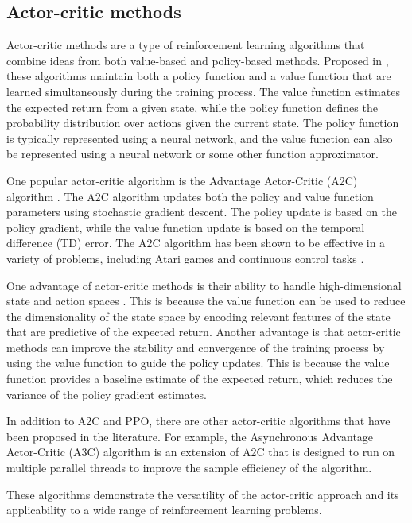 \subsection{Actor-critic methods}
Actor-critic methods are a type of reinforcement learning algorithms that combine ideas from both value-based and policy-based methods.
Proposed in \autocite{konda1999}, these algorithms maintain both a policy function and a value function that are learned simultaneously during the training process.
The value function estimates the expected return from a given state, while the policy function defines the probability distribution over actions given the current state.
The policy function is typically represented using a neural network, and the value function can also be represented using a neural network or some other function approximator.

One popular actor-critic algorithm is the Advantage Actor-Critic (A2C) algorithm \autocite{mnih2016}.
The A2C algorithm updates both the policy and value function parameters using stochastic gradient descent.
The policy update is based on the policy gradient, while the value function update is based on the temporal difference (TD) error.
The A2C algorithm has been shown to be effective in a variety of problems, including Atari games and continuous control tasks \autocite{NEEDED}.

One advantage of actor-critic methods is their ability to handle high-dimensional state and action spaces \autocite{NEEDED}.
This is because the value function can be used to reduce the dimensionality of the state space by encoding relevant features of the state that are predictive of the expected return.
Another advantage is that actor-critic methods can improve the stability and convergence of the training process by using the value function to guide the policy updates.
This is because the value function provides a baseline estimate of the expected return, which reduces the variance of the policy gradient estimates.

In addition to A2C and PPO, there are other actor-critic algorithms that have been proposed in the literature.
For example, the Asynchronous Advantage Actor-Critic (A3C) algorithm \autocite{mnih2016} is an extension of A2C that is designed to run on multiple parallel threads to improve the sample efficiency of the algorithm.

These algorithms demonstrate the versatility of the actor-critic approach and its applicability to a wide range of reinforcement learning problems.